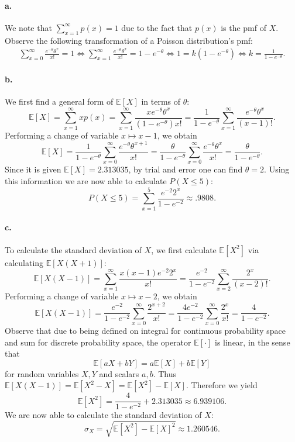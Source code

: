 \documentclass{exam}
\begin{document}
\paragraph{a.} We note that $\sum_{x = 1}^\infty p(x) = 1$ due to the fact that $p(x)$ is the pmf of $X$. Observe the following transformation of a Poisson distribution's pmf:
\begin{align*}
	\sum_{x = 0}^\infty \frac{e^{-\theta}\theta^x}{x!} = 1 \iff \sum_{x = 1}^\infty \frac{e^{-\theta}\theta^x}{x!} = 1 - e^{-\theta} \iff 1 = k(1 - e^{-\theta}) \iff k = \frac1{1 - e^{-\theta}}.
\end{align*}

\paragraph{b.} We first find a general form of $\mathbb E[X]$ in terms of $\theta$:
\[
	\mathbb E[X] = \sum_{x = 1}^\infty xp(x) = \sum_{x = 1}^\infty \frac{xe^{-\theta}\theta^x}{(1 - e^{-\theta})x!} = \frac{1}{1 - e^{-\theta}} \sum_{x = 1}^\infty \frac{e^{-\theta}\theta^x}{(x - 1)!}.
\]
Performing a change of variable $x \mapsto x - 1$, we obtain
\[
	\mathbb E[X] = \frac{1}{1 - e^{-\theta}}\sum_{x = 0}^\infty \frac{e^{-\theta}\theta^{x + 1}}{x!} = \frac{\theta}{1 - e^{-\theta}}\sum_{x = 0}^\infty \frac{e^{-\theta}\theta^x}{x!} = \frac{\theta}{1 - e^{-\theta}}.
\]
Since it is given $\mathbb E[X] = 2.313035$, by trial and error one can find $\theta = 2$. Using this information we are now able to calculate $P(X \le 5)$:
\[
	P(X \le 5) = \sum_{x = 1}^5 \frac{e^{-2}2^x}{1 - e^{-2}} \approx .9808.
\]

\paragraph{c.} To calculate the standard deviation of $X$, we first calculate $\mathbb E[X^2]$ via calculating $\mathbb E[X(X + 1)]$:
\[
	\mathbb E[X(X - 1)] = \sum_{x = 1}^\infty \frac{x(x - 1)e^{-2}2^x}{x!} = \frac{e^{-2}}{1 - e^{-2{}}} \sum_{x = 2}^\infty \frac{2^x}{(x - 2)!}.
\]
Performing a change of variable $x \mapsto x - 2$, we obtain
\[
	\mathbb E[X(X - 1)] = \frac{e^{-2}}{1 - e^{-2}} \sum_{x = 0}^\infty \frac{2^{x + 2}}{x!} = \frac{4e^{-2}}{1 - e^{-2}} \sum_{x = 0}^\infty \frac{2^x}{x!} = \frac{4}{1 - e^{-2}}.
\]
Observe that due to being defined on integral for continuous probability space and sum for discrete probability space, the operator $\mathbb E[\cdot]$ is linear, in the sense that
\[
	\mathbb E[aX + bY] = a\mathbb E[X] + b\mathbb E[Y]
\]
for random variables $X, Y$ and scalars $a, b$. Thus $\mathbb E[X(X - 1)] = \mathbb E[X^2 - X] = \mathbb E[X^2] - \mathbb E[X]$. Therefore we yield
\[
	\mathbb E[X^2] = \frac4{1 - e^{-2}} + 2.313035 \approx 6.939106.
\]
We are now able to calculate the standard deviation of $X$:
\[
	\sigma_X = \sqrt{\mathbb E[X^2] - \mathbb E[X]^2} \approx 1.260546.
\]
\end{document}
